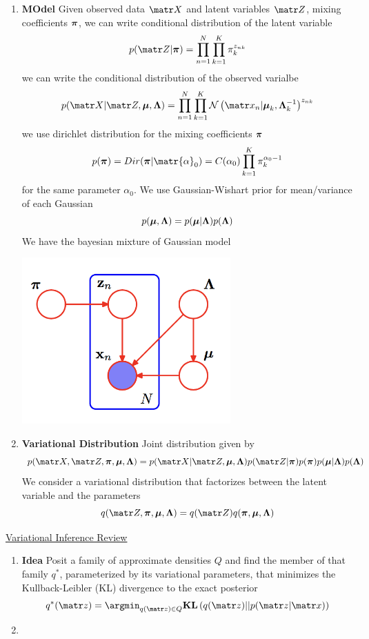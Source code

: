 \documentclass[11pt]{article}
\begin{document}
 


\begin{enumerate}
    \item \textbf{MOdel} Given observed data $\bX$ and latent variables $\bZ$, mixing coefficients $\boldsymbol{\pi}$, we can write conditional distribution of the latent variable 
    \[
        p(\bZ | \bpi) = \prod_{n=1}^N \prod_{k=1}^K \pi_k^{z_{nk}}
    \]
    we can write the conditional distribution of the observed varialbe
    \[
        p(\bX | \bZ, \bmu, \bLambda) = 
        \prod_{n=1}^N \prod_{k=1}^K \normal{\bx_n | \bmu_k , \bLambda_k^{-1}}^{z_{nk}}
    \]
    we use dirichlet distribution for the mixing coefficients $\boldsymbol{\pi}$ 
    \[
        p(\bpi) = Dir(\bpi | \matr{\alpha}_0) = C(\alpha_0) \prod_{k=1}^K \pi_k^{\alpha_0 - 1}
    \]
    for the same parameter $\alpha_0$. We use Gaussian-Wishart prior for mean/variance of each Gaussian 
    \[
        p(\boldsymbol{\mu}, \boldsymbol{\Lambda}) = p(\boldsymbol{\mu} | \boldsymbol{\Lambda}) p(\boldsymbol{\Lambda})
    \]
    We have the bayesian mixture of Gaussian model 
    \begin{center}
        \includegraphics[width=8cm]{bayesian_gaussian_mixture.png}
    \end{center}
    \item \textbf{Variational Distribution} Joint distribution given by 
    \[
        p(\bX, \bZ, \bpi, \bmu, \bLambda) = 
        p(\bX | \bZ, \bmu, \bLambda) p(\bZ | \bpi) p(\bpi) p(\bmu | \bLambda) p(\bLambda)  
    \]
    We consider a variational distribution that factorizes between the latent variable and the parameters 
    \[
        q(\bZ, \bpi, \bmu, \bLambda) = q(\bZ) q(\bpi, \bmu, \bLambda)
    \]
    
\end{enumerate}




\href{2018_variational_inference_a_review_for_statisticians.pdf}{Variational Inference Review}

\begin{enumerate}
    \item \textbf{Idea} Posit a family of approximate densities $Q$ and find the member of that family $q^*$, parameterized by its variational parameters, that minimizes the Kullback-Leibler (KL) divergence to the exact posterior
    \[
        q^*(\bz) = \argmin_{q(\bz)\in Q} \kl{q(\bz)}{p(\bz | \bx)}
    \]
    \item \textbf{}
\end{enumerate}

 
\end{document}
